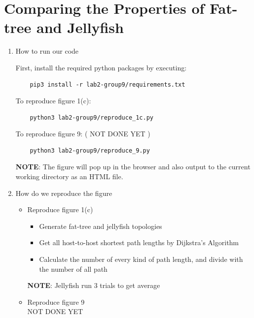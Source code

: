 \documentclass[a4paper,11pt]{article}
\begin{document}
\newpage

\section{Comparing the Properties of Fat-tree and Jellyfish}
\begin{enumerate}
    \item How to run our code
    \begin{itemize}
    First, install the required python packages by executing:
    \begin{verbatim}
    pip3 install -r lab2-group9/requirements.txt
    \end{verbatim}
    To reproduce figure 1(c):
    \begin{verbatim}
    python3 lab2-group9/reproduce_1c.py
    \end{verbatim}
    To reproduce figure 9: ( NOT DONE YET )
    \begin{verbatim}
    python3 lab2-group9/reproduce_9.py
    \end{verbatim}
    \textbf{NOTE}: The figure will pop up in the browser and also output to the current working directory as an HTML file.
    \end{itemize}
    \item How do we reproduce the figure
    \begin{itemize}
        \item Reproduce figure 1(c)
            \begin{itemize}
            \item Generate fat-tree and jellyfish topologies
            \item Get all host-to-host shortest path lengths by Dijkstra's Algorithm
            \item Calculate the number of every kind of path length, and divide with the number of all path
            \end{itemize}
            \textbf{NOTE}: Jellyfish run 3 trials to get average
        \item Reproduce figure 9\\
            NOT DONE YET
    \end{itemize}


\end{enumerate}
\end{document}
